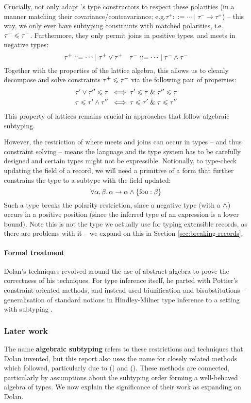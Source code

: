 Crucially, \textcite{mlsub} not only adapt \mlsub{}'s type constructors to respect these polarities (in a manner matching their covariance/contravariance; e.g.\@ $\tau^+ ::= \cdots \mid \tau^- \to \tau^+$) -- this way, we only ever have subtyping constraints with matched polarities, i.e.\@ $\tau^+ \leqslant \tau^-$. Furthermore, they only permit joins in positive types, and meets in negative types:
$$ \tau^+ ::= \cdots \mid \tau^+ \lor \tau^+ \quad \tau^- ::= \cdots \mid \tau^- \land \tau^- $$
Together with the properties of the lattice algebra, this allows us to cleanly decompose and solve constraints $\tau^+ \leqslant \tau^-$ via the following pair of properties:
\begin{align*}
\tau' \lor \tau'' \leqslant \tau \;&\iff \tau' \leqslant \tau \;\&\; \tau'' \leqslant \tau \\
\tau \leqslant \tau' \land \tau'' \;&\iff \tau \leqslant \tau' \;\&\; \tau \leqslant \tau'' 
\end{align*}
This property of lattices remains crucial in approaches that follow algebraic subtyping.

However, the restriction of where meets and joins can occur in types -- and thus constraint solving -- means the language and its type system has to be carefully designed and certain types might not be expressible. 
Notionally, to type-check updating the field of a record, we will need a primitive of a form that further constrains the type to a subtype with the field updated:
$$ \forall \alpha, \beta \ldotp \alpha \to \alpha \land \flrec{\mathrm{foo}: \beta}  $$
Such a type breaks the polarity restriction, since a negative type (with a $\land$) occurs in a positive position (since the inferred type of an expression is a lower bound).
Note this is not the type we actually use for typing extensible records, as there are problems with it -- we expand on this in Section \ref{sec:breaking-records}.

\paragraph{Formal treatment} Dolan's techniques revolved around the use of abstract algebra to prove the correctness of his techniques. For type inference itself, he parted with Pottier's constraint-oriented methods, and instead used biunification and bisubstitutions -- generalisation of standard notions in Hindley-Milner type inference to a setting with subtyping \cite{tapl, dolan-thesis}. 

\subsubsection{Later work}
The name \textbf{algebraic subtyping} refers to these restrictions and techniques that Dolan invented, but this report also uses the name for closely related methods which followed, particularly due to \textcite{simple-sub} (\simplesub{}) and \textcite{mlstruct} (\mlstruct{}). These methods are connected, particularly by assumptions about the subtyping order forming a well-behaved algebra of types. We now explain the significance of their work as expanding on Dolan.

